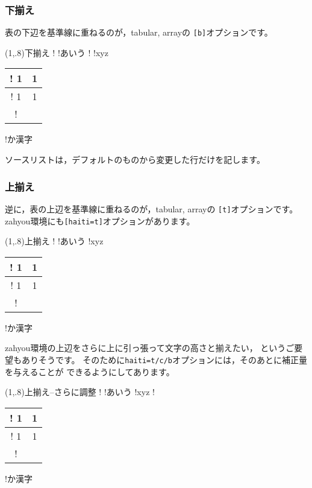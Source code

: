 \subsubsection{下揃え}
表の下辺を基準線に重ねるのが，\textsf{tabular, array}の
\verb+[b]+オプションです。

\begin{showpEx}(1,.8){下揃え}
!\kizyunsen
!あいう%
!%
!xyz%
\begin{tabular}[b]{|c|c|}\hline
!  1 & 1 \\\hline
!  1 & 1 \\\hline
!\end{tabular}%
!か漢字%
\end{showpEx}

ソースリストは，デフォルトのものから変更した行だけを記します。

\subsubsection{上揃え}
逆に，表の上辺を基準線に重ねるのが，\textsf{tabular, array}の
\verb+[t]+オプションです。
\textsf{zahyou}環境にも\verb+[haiti=t]+オプションがあります。

\begin{showpEx}(1,.8){上揃え}
!\kizyunsen
!あいう%
%
!xyz%
\begin{tabular}[t]{|c|c|}\hline
!  1 & 1 \\\hline
!  1 & 1 \\\hline
!\end{tabular}%
!か漢字%
\end{showpEx}

\textsf{zahyou}環境の上辺をさらに上に引っ張って文字の高さと揃えたい，
というご要望もありそうです。
そのために\verb+haiti=t/c/b+オプションには，そのあとに補正量を与えることが
できるようにしてあります。

\begin{showpEx}(1,.8){上揃え--さらに調整}
!\kizyunsen
!あいう%
%
!xyz%
!\begin{tabular}[t]{|c|c|}\hline
!  1 & 1 \\\hline
!  1 & 1 \\\hline
!\end{tabular}%
!か漢字%
\end{showpEx}


